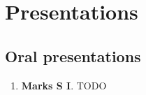 \chapter*{Presentations}  

\section*{Oral presentations}

\begin{enumerate}
      \item \textbf{Marks S I}. TODO
\end{enumerate}

